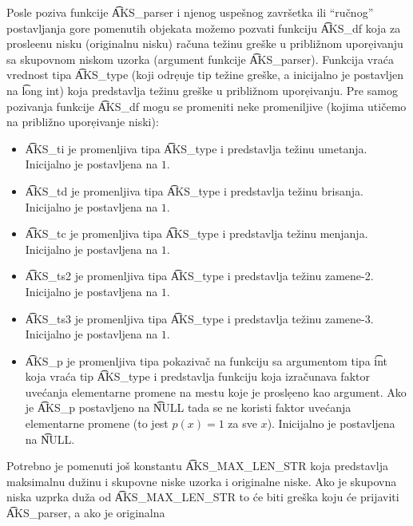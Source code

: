     Posle poziva funkcije \t{AKS\_parser} i njenog uspe\v{s}nog zavr\v{s}etka
    ili ``ru\v{c}nog'' posta\-vljanja gore pomenutih objekata mo\v{z}emo
    pozvati funkciju \t{AKS\_df} koja za prosle\-{\d}enu nisku (originalnu
    nisku) ra\v{c}una te\v{z}inu gre\v{s}ke u pribli\v{z}nom upore{\d}ivanju
    sa skupovnom niskom uzorka (argument funkcije \t{AKS\_parser}).
    Funkcija vra\'ca vrednost tipa \t{AKS\_type} (koji odre{\d}uje tip
    te\v{z}ine gre\v{s}ke, a inicijalno je posta\-vljen na \t{long int})
    koja predstavlja te\v{z}inu gre\v{s}ke u pribli\v{z}nom upore{\d}ivanju.
    Pre samog pozivanja funkcije \t{AKS\_df} mogu se promeniti neke
    promeniljive (kojima uti\v{c}emo na pribli\v{z}no upore{\d}ivanje niski):
    \begin{itemize}
      \item
        \t{AKS\_ti} je promenljiva tipa \t{AKS\_type} i predstavlja te\v{z}inu
        umetanja.
        Inicijalno je postavljena na $1$.
      \item
        \t{AKS\_td} je promenljiva tipa \t{AKS\_type} i predstavlja te\v{z}inu
        brisanja.
        Inicijalno je postavljena na $1$.
      \item
        \t{AKS\_tc} je promenljiva tipa \t{AKS\_type} i predstavlja te\v{z}inu
        menjanja.
        Inicijalno je postavljena na $1$.
      \item
        \t{AKS\_ts2} je promenljiva tipa \t{AKS\_type} i predstavlja te\v{z}inu
        zamene-2.
        Inicijalno je postavljena na $1$.
      \item
        \t{AKS\_ts3} je promenljiva tipa \t{AKS\_type} i predstavlja te\v{z}inu
        zamene-3.
        Inicijalno je postavljena na $1$.
      \item
        \t{AKS\_p} je promenljiva tipa pokaziva\v{c} na funkciju sa argumentom
        tipa \t{int} koja vra\'ca tip \t{AKS\_type} i predstavlja funkciju
        koja izra\v{c}unava faktor uve\'canja elementarne promene na mestu koje
        je prosle{\d}eno kao argument.
        Ako je \t{AKS\_p} postavljeno na \t{NULL} tada se ne koristi faktor
        uve\'canja elementarne promene (to jest $p(x)=1$ za sve $x$).
        Inicijalno je postavljena na \t{NULL}.
    \end{itemize}
    Potrebno je pomenuti jo\v{s} konstantu \t{AKS\_MAX\_LEN\_STR} koja
    predstavlja maksimalnu du\v{z}inu i skupovne niske uzorka i originalne
    niske.
    Ako je skupovna niska uzprka du\v{z}a od \t{AKS\_MAX\_LEN\_STR} to \'ce
    biti gre\v{s}ka koju \'ce prijaviti \t{AKS\_parser}, a ako je originalna
